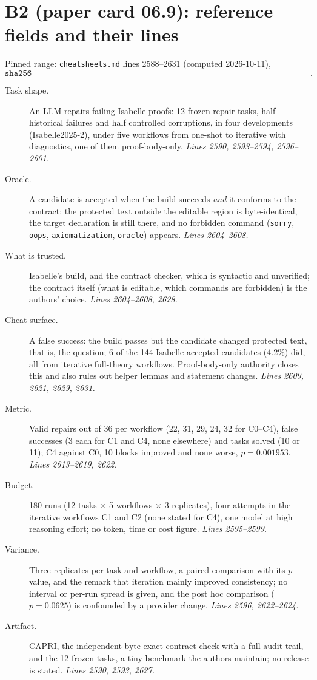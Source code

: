 \documentclass[11pt]{article}
\begin{document}
\section*{B2 (paper card 06.9): reference fields and their lines}

Pinned range: \texttt{cheatsheets.md} lines 2588--2631 (computed 2026-10-11),
\[ \texttt{sha256 993a2dfbe563247916b85f81105abf302e12b6a340be78e25dc3c9fa8c152b5b}. \]

\begin{description}
\item[Task shape.] An LLM repairs failing Isabelle proofs: 12 frozen repair
  tasks, half historical failures and half controlled corruptions, in four
  developments (Isabelle2025-2), under five workflows from one-shot to
  iterative with diagnostics, one of them proof-body-only. \emph{Lines 2590,
  2593--2594, 2596--2601.}
\item[Oracle.] A candidate is accepted when the build succeeds \emph{and} it
  conforms to the contract: the protected text outside the editable region is
  byte-identical, the target declaration is still there, and no forbidden
  command (\texttt{sorry}, \texttt{oops}, \texttt{axiomatization},
  \texttt{oracle}) appears. \emph{Lines 2604--2608.}
\item[What is trusted.] Isabelle's build, and the contract checker, which is
  syntactic and unverified; the contract itself (what is editable, which
  commands are forbidden) is the authors' choice. \emph{Lines 2604--2608,
  2628.}
\item[Cheat surface.] A false success: the build passes but the candidate
  changed protected text, that is, the question; 6 of the 144
  Isabelle-accepted candidates (4.2\%) did, all from iterative full-theory
  workflows. Proof-body-only authority closes this and also rules out helper
  lemmas and statement changes. \emph{Lines 2609, 2621, 2629, 2631.}
\item[Metric.] Valid repairs out of 36 per workflow (22, 31, 29, 24, 32 for
  C0--C4), false successes (3 each for C1 and C4, none elsewhere) and tasks
  solved (10 or 11); C4 against C0, 10 blocks improved and none worse,
  $p = 0.001953$. \emph{Lines 2613--2619, 2622.}
\item[Budget.] 180 runs (12 tasks $\times$ 5 workflows $\times$ 3
  replicates), four attempts in the iterative workflows C1 and C2 (none stated
  for C4), one model at high reasoning effort; no token, time or cost figure. \emph{Lines 2595--2599.}
\item[Variance.] Three replicates per task and workflow, a paired comparison
  with its $p$-value, and the remark that iteration mainly improved
  consistency; no interval or per-run spread is given, and the post hoc
  comparison ($p = 0.0625$) is confounded by a provider change.
  \emph{Lines 2596, 2622--2624.}
\item[Artifact.] CAPRI, the independent byte-exact contract check with a full
  audit trail, and the 12 frozen tasks, a tiny benchmark the authors maintain;
  no release is stated. \emph{Lines 2590, 2593, 2627.}
\end{description}
\end{document}
